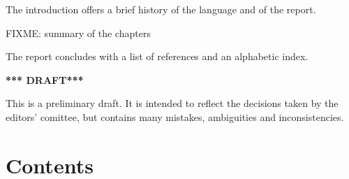 \vest The introduction offers a brief history of the language and of
the report.

\vest FIXME: summary of the chapters

\vest The report concludes with a list of references and an
alphabetic index.


\vfill
\begin{center}
{\large \bf
*** DRAFT*** \\
}\end{center}

This is a preliminary draft.  It is intended to reflect the decisions
taken by the editors' comittee, but contains many mistakes,
ambiguities and inconsistencies.

\vfill
\eject

\chapter*{Contents}
\addvspace{3.5pt}                  %
\renewcommand{\tocshrink}{-3.5pt}  %
{\footnotesize
\tableofcontents
}

\vfill
\eject

